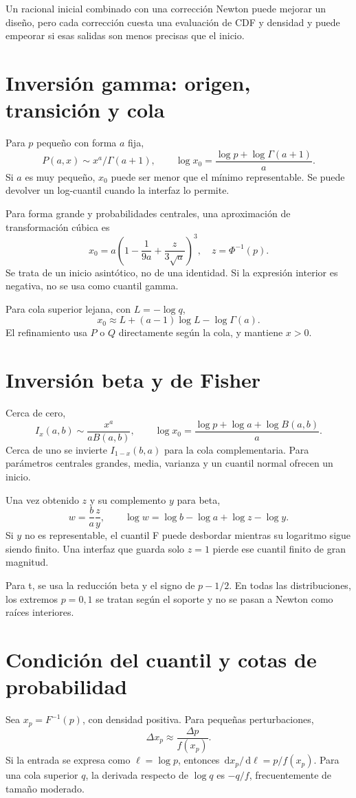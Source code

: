 \documentclass[11pt,a4paper]{article}
\newcommand{\dd}{\,\mathrm d}
\theoremstyle{definition}
\begin{document}
Un racional inicial combinado con una corrección Newton puede mejorar un diseño, pero cada corrección cuesta una evaluación de CDF y densidad y puede empeorar si esas salidas son menos precisas que el inicio.

\section{Inversión gamma: origen, transición y cola}
Para $p$ pequeño con forma $a$ fija,
\[
P(a,x)\sim x^a/\Gamma(a+1),\qquad
\log x_0=\frac{\log p+\log\Gamma(a+1)}a.
\]
Si $a$ es muy pequeño, $x_0$ puede ser menor que el mínimo representable. Se puede devolver un log-cuantil cuando la interfaz lo permite.

Para forma grande y probabilidades centrales, una aproximación de transformación cúbica es
\[
x_0=a\left(1-\frac1{9a}+\frac z{3\sqrt a}\right)^3,
\quad z=\Phi^{-1}(p).
\]
Se trata de un inicio asintótico, no de una identidad. Si la expresión interior es negativa, no se usa como cuantil gamma.

Para cola superior lejana, con $L=-\log q$,
\[
x_0\approx L+(a-1)\log L-\log\Gamma(a).
\]
El refinamiento usa $P$ o $Q$ directamente según la cola, y mantiene $x>0$.

\section{Inversión beta y de Fisher}
Cerca de cero,
\[
I_x(a,b)\sim\frac{x^a}{aB(a,b)},\qquad
\log x_0=\frac{\log p+\log a+\log B(a,b)}a.
\]
Cerca de uno se invierte $I_{1-x}(b,a)$ para la cola complementaria. Para parámetros centrales grandes, media, varianza y un cuantil normal ofrecen un inicio.

Una vez obtenido $z$ y su complemento $y$ para beta,
\[
w=\frac ba\frac zy,\qquad
\log w=\log b-\log a+\log z-\log y.
\]
Si $y$ no es representable, el cuantil F puede desbordar mientras su logaritmo sigue siendo finito. Una interfaz que guarda solo $z=1$ pierde ese cuantil finito de gran magnitud.

Para t, se usa la reducción beta y el signo de $p-1/2$. En todas las distribuciones, los extremos $p=0,1$ se tratan según el soporte y no se pasan a Newton como raíces interiores.

\section{Condición del cuantil y cotas de probabilidad}
Sea $x_p=F^{-1}(p)$, con densidad positiva. Para pequeñas perturbaciones,
\[
\Delta x_p\approx\frac{\Delta p}{f(x_p)}.
\]
Si la entrada se expresa como $\ell=\log p$, entonces
$\dd x_p/\dd\ell=p/f(x_p)$. Para una cola superior $q$, la derivada respecto de $\log q$ es $-q/f$, frecuentemente de tamaño moderado.
\end{document}
